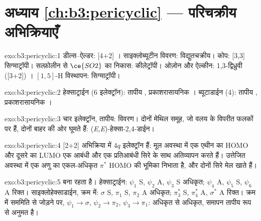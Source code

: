 \section*{अध्याय \ref{ch:b3:pericyclic} --- परिचक्रीय अभिक्रियाएँ}

\begin{solution}{exo:b3:pericyclic:1}
डील्स--ऐल्डर: [4+2] । साइक्लोब्यूटीन विवरण: विद्युतचक्रीय। कोप: [3,3]
सिग्माट्रॉपी। सल्फ़ोलीन से $\ce{SO2}$ का निकास: कीलेट्रॉपी। ओज़ोन और ऐल्कीन: 1,3-द्विध्रुवी
([3+2]) । $[1,5]$-H विस्थापन: सिग्माट्रॉपी।
\end{solution}

\begin{solution}{exo:b3:pericyclic:2}
हेक्साट्राईन (6 इलेक्ट्रॉन): तापीय , प्रकाशरासायनिक ।
ब्यूटाडाईन (4): तापीय , प्रकाशरासायनिक ।
\end{solution}

\begin{solution}{exo:b3:pericyclic:3}
चार इलेक्ट्रॉन, तापीय:  विवरण। दोनों मेथिल समूह, जो वलय के विपरीत
फलकों पर हैं, दोनों बाहर की ओर घूमते हैं: (\textit{E},\textit{E})-हेक्सा-2,4-डाईन।
\end{solution}

\begin{solution}{exo:b3:pericyclic:4}
 [2+2] अभिक्रिया में $4q$ इलेक्ट्रॉन हैं: मूल अवस्था में एक
एथीन का HOMO और दूसरे का LUMO एक आबंधी और एक प्रतिआबंधी सिरे के साथ अतिव्यापन करते हैं।
उत्तेजित अवस्था में एक अणु का एकल-अधिकृत $\pi^*$
HOMO की भूमिका निभाता है, और दोनों सिरे मेल खाते हैं।
\end{solution}

\begin{solution}{exo:b3:pericyclic:5}
 बना रहता है। हेक्साट्राईन: $\psi_1$ S, $\psi_2$ A, $\psi_3$ S अधिकृत; $\psi_4$ A, $\psi_5$ S, $\psi_6$ A रिक्त।
साइक्लोहेक्साडाईन, क्रम में: $\sigma$ S, $\pi_1$ S, $\pi_2$ A अधिकृत; $\pi_3^*$ S, $\pi_4^*$ A, $\sigma^*$ A रिक्त। क्रम में
सममिति से जोड़ने पर, $\psi_1 \to \sigma$, $\psi_2 \to \pi_2$, $\psi_3 \to \pi_1$: अधिकृत से अधिकृत,  समापन
तापीय रूप से अनुमत है।
\end{solution}

